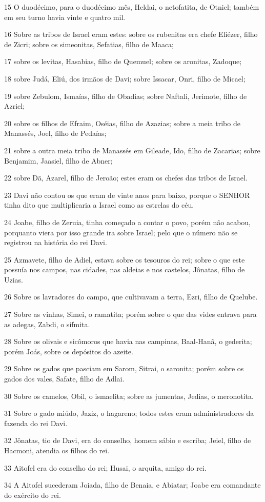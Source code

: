 \par 15 O duodécimo, para o duodécimo mês, Heldai, o netofatita, de Otniel; também em seu turno havia vinte e quatro mil.
\par 16 Sobre as tribos de Israel eram estes: sobre os rubenitas era chefe Eliézer, filho de Zicri; sobre os simeonitas, Sefatias, filho de Maaca;
\par 17 sobre os levitas, Hasabias, filho de Quemuel; sobre os aronitas, Zadoque;
\par 18 sobre Judá, Eliú, dos irmãos de Davi; sobre Issacar, Onri, filho de Micael;
\par 19 sobre Zebulom, Ismaías, filho de Obadias; sobre Naftali, Jerimote, filho de Azriel;
\par 20 sobre os filhos de Efraim, Oséias, filho de Azazias; sobre a meia tribo de Manassés, Joel, filho de Pedaías;
\par 21 sobre a outra meia tribo de Manassés em Gileade, Ido, filho de Zacarias; sobre Benjamim, Jaasiel, filho de Abner;
\par 22 sobre Dã, Azarel, filho de Jeroão; estes eram os chefes das tribos de Israel.
\par 23 Davi não contou os que eram de vinte anos para baixo, porque o SENHOR tinha dito que multiplicaria a Israel como as estrelas do céu.
\par 24 Joabe, filho de Zeruia, tinha começado a contar o povo, porém não acabou, porquanto viera por isso grande ira sobre Israel; pelo que o número não se registrou na história do rei Davi.
\par 25 Azmavete, filho de Adiel, estava sobre os tesouros do rei; sobre o que este possuía nos campos, nas cidades, nas aldeias e nos castelos, Jônatas, filho de Uzias.
\par 26 Sobre os lavradores do campo, que cultivavam a terra, Ezri, filho de Quelube.
\par 27 Sobre as vinhas, Simei, o ramatita; porém sobre o que das vides entrava para as adegas, Zabdi, o sifmita.
\par 28 Sobre os olivais e sicômoros que havia nas campinas, Baal-Hanã, o gederita; porém Joás, sobre os depósitos do azeite.
\par 29 Sobre os gados que pasciam em Sarom, Sitrai, o saronita; porém sobre os gados dos vales, Safate, filho de Adlai.
\par 30 Sobre os camelos, Obil, o ismaelita; sobre as jumentas, Jedias, o meronotita.
\par 31 Sobre o gado miúdo, Jaziz, o hagareno; todos estes eram administradores da fazenda do rei Davi.
\par 32 Jônatas, tio de Davi, era do conselho, homem sábio e escriba; Jeiel, filho de Hacmoni, atendia os filhos do rei.
\par 33 Aitofel era do conselho do rei; Husai, o arquita, amigo do rei.
\par 34 A Aitofel sucederam Joiada, filho de Benaia, e Abiatar; Joabe era comandante do exército do rei.

